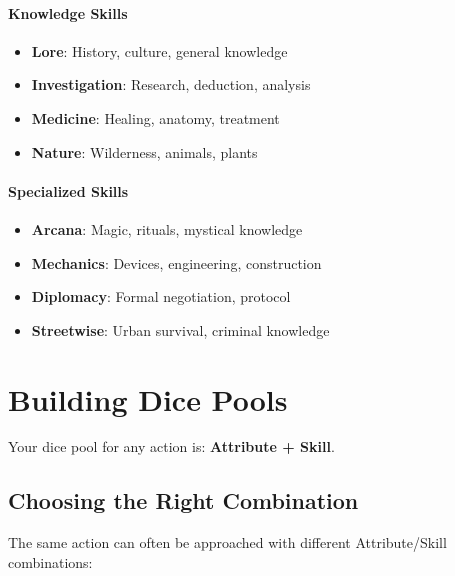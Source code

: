 \paragraph{Knowledge Skills}
\begin{itemize}
\item \textbf{Lore}: History, culture, general knowledge
\item \textbf{Investigation}: Research, deduction, analysis
\item \textbf{Medicine}: Healing, anatomy, treatment
\item \textbf{Nature}: Wilderness, animals, plants
\end{itemize}

\paragraph{Specialized Skills}
\begin{itemize}
\item \textbf{Arcana}: Magic, rituals, mystical knowledge
\item \textbf{Mechanics}: Devices, engineering, construction
\item \textbf{Diplomacy}: Formal negotiation, protocol
\item \textbf{Streetwise}: Urban survival, criminal knowledge
\end{itemize}

\section{Building Dice Pools}

Your dice pool for any action is: \textbf{Attribute + Skill}.

\subsection*{Choosing the Right Combination}
The same action can often be approached with different Attribute/Skill combinations:

